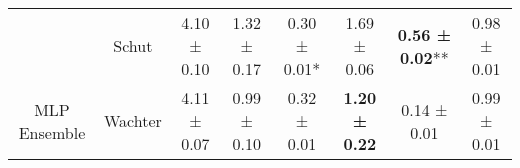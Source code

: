 \begin{table}
{\begin{tabular}[t]{cccccccc}
 & Schut & 4.10 ± 0.10\hphantom{*}\hphantom{*} & 1.32 ± 0.17\hphantom{*}\hphantom{*} & 0.30 ± 0.01*\hphantom{*} & 1.69 ± 0.06\hphantom{*}\hphantom{*} & \textbf{0.56 ± 0.02}** & 0.98 ± 0.01\hphantom{*}\hphantom{*}\\

\multirow[t]{-7}{*}{\centering\arraybackslash MLP Ensemble} & Wachter & 4.11 ± 0.07\hphantom{*}\hphantom{*} & 0.99 ± 0.10\hphantom{*}\hphantom{*} & 0.32 ± 0.01\hphantom{*}\hphantom{*} & \textbf{1.20 ± 0.22}\hphantom{*}\hphantom{*} & 0.14 ± 0.01\hphantom{*}\hphantom{*} & 0.99 ± 0.01\hphantom{*}\hphantom{*}\\
\bottomrule
\end{tabular}}
\end{table}
